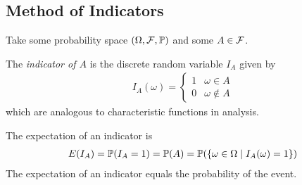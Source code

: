 \subsection{Method of Indicators}
Take some probability space $(\Omega, \mathcal{F}, \mathbb{P})$ and some $A \in \mathcal{F}$.
\begin{definition}
    The \textit{indicator of $A$} is the discrete random variable $I_A$ given by
    \begin{align}
        I_A(\omega) = \begin{cases}
            1 & \omega \in A\\
            0 & \omega \notin A
        \end{cases}
    \end{align}
    which are analogous to characteristic functions in analysis.
\end{definition}
\begin{proposition}
    The expectation of an indicator is
    \begin{align}
        E(I_A) = \mathbb{P}(I_A = 1) = \mathbb{P}(A) = \mathbb{P}\qty(\{ \omega \in \Omega \mid I_A(\omega) = 1 \})
    \end{align}
    The expectation of an indicator equals the probability of the event.
\end{proposition}

